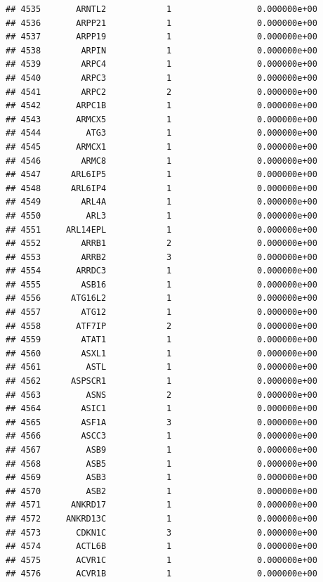 \documentclass[
]{article}
\begin{document}
\begin{verbatim}
## 4535       ARNTL2            1                 0.000000e+00
## 4536       ARPP21            1                 0.000000e+00
## 4537       ARPP19            1                 0.000000e+00
## 4538        ARPIN            1                 0.000000e+00
## 4539        ARPC4            1                 0.000000e+00
## 4540        ARPC3            1                 0.000000e+00
## 4541        ARPC2            2                 0.000000e+00
## 4542       ARPC1B            1                 0.000000e+00
## 4543       ARMCX5            1                 0.000000e+00
## 4544         ATG3            1                 0.000000e+00
## 4545       ARMCX1            1                 0.000000e+00
## 4546        ARMC8            1                 0.000000e+00
## 4547      ARL6IP5            1                 0.000000e+00
## 4548      ARL6IP4            1                 0.000000e+00
## 4549        ARL4A            1                 0.000000e+00
## 4550         ARL3            1                 0.000000e+00
## 4551     ARL14EPL            1                 0.000000e+00
## 4552        ARRB1            2                 0.000000e+00
## 4553        ARRB2            3                 0.000000e+00
## 4554       ARRDC3            1                 0.000000e+00
## 4555        ASB16            1                 0.000000e+00
## 4556      ATG16L2            1                 0.000000e+00
## 4557        ATG12            1                 0.000000e+00
## 4558       ATF7IP            2                 0.000000e+00
## 4559        ATAT1            1                 0.000000e+00
## 4560        ASXL1            1                 0.000000e+00
## 4561         ASTL            1                 0.000000e+00
## 4562      ASPSCR1            1                 0.000000e+00
## 4563         ASNS            2                 0.000000e+00
## 4564        ASIC1            1                 0.000000e+00
## 4565        ASF1A            3                 0.000000e+00
## 4566        ASCC3            1                 0.000000e+00
## 4567         ASB9            1                 0.000000e+00
## 4568         ASB5            1                 0.000000e+00
## 4569         ASB3            1                 0.000000e+00
## 4570         ASB2            1                 0.000000e+00
## 4571      ANKRD17            1                 0.000000e+00
## 4572     ANKRD13C            1                 0.000000e+00
## 4573       CDKN1C            3                 0.000000e+00
## 4574       ACTL6B            1                 0.000000e+00
## 4575       ACVR1C            1                 0.000000e+00
## 4576       ACVR1B            1                 0.000000e+00

\end{verbatim}
\end{document}
